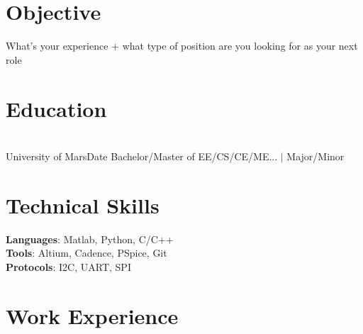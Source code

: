 \section{Objective}
What's your experience + what type of position are you looking for as your next role

\section{Education} \\[1mm]
  \resumeSubHeadingListStart
    \resumeSubheading
      {University of Mars}{Date}
      {Bachelor/Master of EE/CS/CE/ME... $|$ Major/Minor
      }{}
  \resumeSubHeadingListEnd

\section{Technical Skills}
\vspace{-3pt}
 \begin{itemize}[leftmargin=0.15in, label={}]
    \small{\item{   
     \textbf{Languages}{: Matlab, Python, C/C++} \\[1mm]
     \textbf{Tools}{: Altium, Cadence, PSpice, Git} \\[1mm]
     \textbf{Protocols}{: I2C, UART, SPI}
    }}
 \end{itemize}
 \vspace{-20pt}

\vspace{-2pt} 
\section{Work Experience}
    \resumeSubHeadingListStart
                \resumeItemListStart
                    \resumeItemListEnd
                    
                \resumeItemListStart
                    \resumeItemListEnd
                    
